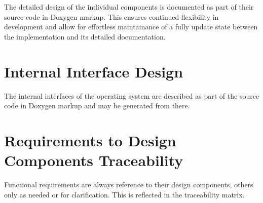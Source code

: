 The detailed design of the individual components is documented as part of 
their source code in Doxygen markup. This ensures continued flexibility in
development and allow for effortless maintainance of a fully update state
between the implementation and its detailed documentation.

\section{Internal Interface Design}

The internal interfaces of the operating system are described as part of the
source code in Doxygen markup and may be generated from there.

\section{Requirements to Design Components Traceability}

\noindent
Functional requirements are always reference to their design components, others
only as needed or for clarification. This is reflected in the traceability
matrix.

\traceabilitymatrix


